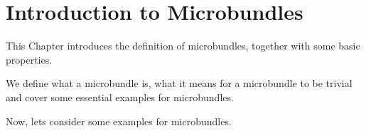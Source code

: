 \chapter{Introduction to Microbundles}\label{chapter::microbundle}
\begin{myparagraph}
    This Chapter introduces the definition of microbundles,
    together with some basic properties.
    
    We define what a microbundle is, what it means for a microbundle to be trivial and 
    cover some essential examples for microbundles.
\end{myparagraph}



\begin{myparagraph}
    Now, lets consider some examples for microbundles.
\end{myparagraph}


